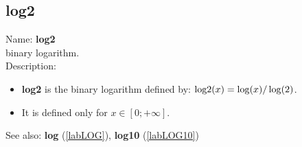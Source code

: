\subsection{log2}
\label{lablog2}
\noindent Name: \textbf{log2}\\
binary logarithm.\\

\noindent Description: \begin{itemize}

\item \textbf{log2} is the binary logarithm defined by: ${\rm log2}(x) = \log(x)/\log(2)$.

\item It is defined only for $x \in [0; +\infty]$.
\end{itemize}
See also: \textbf{log} (\ref{labLOG}), \textbf{log10} (\ref{labLOG10})
